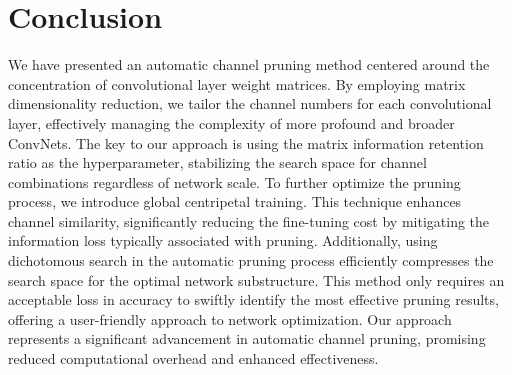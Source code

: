 \documentclass[sigconf, 10pt]{acmart}
\begin{document}
\section{Conclusion}

We have presented an automatic channel pruning method centered around the concentration of convolutional layer weight matrices. By employing matrix dimensionality reduction, we tailor the channel numbers for each convolutional layer, effectively managing the complexity of more profound and broader ConvNets. The key to our approach is using the matrix information retention ratio as the hyperparameter, stabilizing the search space for channel combinations regardless of network scale. To further optimize the pruning process, we introduce global centripetal training. This technique enhances channel similarity, significantly reducing the fine-tuning cost by mitigating the information loss typically associated with pruning. Additionally, using dichotomous search in the automatic pruning process efficiently compresses the search space for the optimal network substructure. This method only requires an acceptable loss in accuracy to swiftly identify the most effective pruning results, offering a user-friendly approach to network optimization. Our approach represents a significant advancement in automatic channel pruning, promising reduced computational overhead and enhanced effectiveness.



\end{document}
